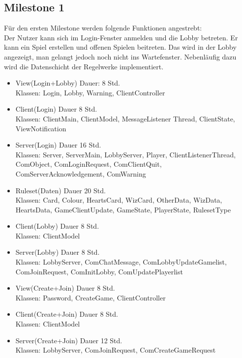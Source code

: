 \documentclass{article}
\begin{document}
\subsection{Milestone 1}
Für den ersten Milestone werden folgende Funktionen angestrebt:\\
Der Nutzer kann sich im Login-Fenster anmelden und die Lobby betreten. Er kann ein Spiel erstellen und offenen Spielen beitreten. Das wird in der Lobby angezeigt, man gelangt jedoch noch nicht ins Wartefenster. Nebenläufig dazu wird die Datenschicht der Regelwerke implementiert.\\ 
\begin{itemize}
\item View(Login+Lobby) Dauer: 8 Std. \\
Klassen: Login, Lobby, Warning, ClientController
\item Client(Login) Dauer 8 Std. \\
Klassen: ClientMain, ClientModel, MessageListener Thread, ClientState, ViewNotification
\item Server(Login) Dauer 16 Std. \\
Klassen: Server, ServerMain, LobbyServer, Player, ClientListenerThread, ComObject, ComLoginRequest, ComClientQuit, ComServerAcknowledgement, ComWarning
\item Ruleset(Daten) Dauer 20 Std. \\
Klassen:  Card, Colour, HeartsCard, WizCard, OtherData, WizData, HeartsData, GameClientUpdate, GameState, PlayerState, RulesetType
\item Client(Lobby) Dauer 8 Std. \\
Klassen: ClientModel
\item Server(Lobby) Dauer 8 Std. \\
Klassen: LobbyServer, ComChatMessage, ComLobbyUpdateGamelist, ComJoinRequest, ComInitLobby, ComUpdatePlayerlist
\item View(Create+Join) Dauer 8 Std. \\
Klassen: Password, CreateGame, ClientController
\item Client(Create+Join) Dauer 8 Std. \\
Klassen: ClientModel
\item Server(Create+Join) Dauer 12 Std. \\
Klassen: LobbyServer, ComJoinRequest, ComCreateGameRequest
\end{itemize}
\end{document}
